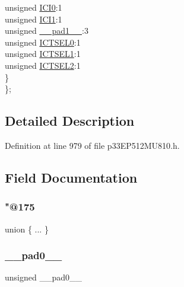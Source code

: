 \begin{DoxyCompactItemize}
\begin{tabbing}
\>\>unsigned \hyperlink{structtag_i_c9_c_o_n1_b_i_t_s_a6f1b5da2706b7c15fc8c9a01a30deaff}{ICI0}:1\\
\>\>unsigned \hyperlink{structtag_i_c9_c_o_n1_b_i_t_s_a7d5c777f0bc43f66f40462f79ed2179c}{ICI1}:1\\
\>\>unsigned \hyperlink{structtag_i_c9_c_o_n1_b_i_t_s_acaf2d0924a107ec6e8d2e31febaf66f9}{\_\_pad1\_\_}:3\\
\>\>unsigned \hyperlink{structtag_i_c9_c_o_n1_b_i_t_s_af6dd4d0e816b18462680d4b22fa926d3}{ICTSEL0}:1\\
\>\>unsigned \hyperlink{structtag_i_c9_c_o_n1_b_i_t_s_aa29140e739d886362537f87d199c4134}{ICTSEL1}:1\\
\>\>unsigned \hyperlink{structtag_i_c9_c_o_n1_b_i_t_s_a47d80892d449e6edbd5ba2ba9ff06deb}{ICTSEL2}:1\\
\>\} \\
\}; \\

\end{tabbing}\end{DoxyCompactItemize}


\subsection{Detailed Description}


Definition at line 979 of file p33\+E\+P512\+M\+U810.\+h.



\subsection{Field Documentation}
\mbox{\label{structtag_i_c9_c_o_n1_b_i_t_s_a49b9fcd8c454a1ad00bfc92dcb57c393}} 
\subsubsection{\texorpdfstring{"@175}{@175}}
{\footnotesize\ttfamily union \{ ... \} }

\mbox{\label{structtag_i_c9_c_o_n1_b_i_t_s_adf71f3d8410c1f1dbbc96680a92c49af}} 
\subsubsection{\texorpdfstring{\+\_\+\+\_\+pad0\+\_\+\+\_\+}{\_\_pad0\_\_}}
{\footnotesize\ttfamily unsigned \+\_\+\+\_\+pad0\+\_\+\+\_\+}



